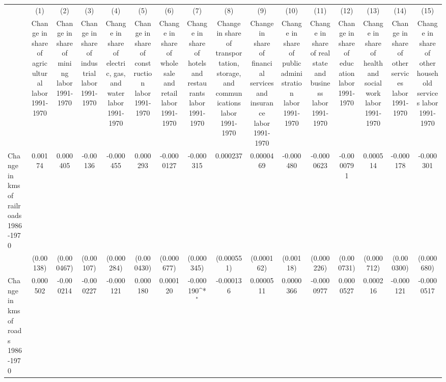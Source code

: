 {
\def\sym#1{\ifmmode^{#1}\else\(^{#1}\)\fi}
\begin{tabular}{l*{15}{c}}
\hline\hline
                &\multicolumn{1}{c}{(1)}&\multicolumn{1}{c}{(2)}&\multicolumn{1}{c}{(3)}&\multicolumn{1}{c}{(4)}&\multicolumn{1}{c}{(5)}&\multicolumn{1}{c}{(6)}&\multicolumn{1}{c}{(7)}&\multicolumn{1}{c}{(8)}&\multicolumn{1}{c}{(9)}&\multicolumn{1}{c}{(10)}&\multicolumn{1}{c}{(11)}&\multicolumn{1}{c}{(12)}&\multicolumn{1}{c}{(13)}&\multicolumn{1}{c}{(14)}&\multicolumn{1}{c}{(15)}\\
                &\multicolumn{1}{c}{Change in share of agricultural labor 1991-1970}&\multicolumn{1}{c}{Change in share of mining labor 1991-1970}&\multicolumn{1}{c}{Change in share of industrial labor 1991-1970}&\multicolumn{1}{c}{Change in share of electric, gas, and water labor 1991-1970}&\multicolumn{1}{c}{Change in share of construction labor 1991-1970}&\multicolumn{1}{c}{Change in share of wholesale and retail labor 1991-1970}&\multicolumn{1}{c}{Change in share of hotels and restaurants labor 1991-1970}&\multicolumn{1}{c}{Change in share of transportation, storage, and communications labor 1991-1970}&\multicolumn{1}{c}{Change in share of financial services and insurance labor 1991-1970}&\multicolumn{1}{c}{Change in share of public administration labor 1991-1970}&\multicolumn{1}{c}{Change in share of real state and business labor 1991-1970}&\multicolumn{1}{c}{Change in share of education labor 1991-1970}&\multicolumn{1}{c}{Change in share of health and social work labor 1991-1970}&\multicolumn{1}{c}{Change in share of other services labor 1991-1970}&\multicolumn{1}{c}{Change in share of other household services labor 1991-1970}\\
\hline
Change in kms of railroads 1986-1970&  0.00174         & 0.000405         & -0.00136         &-0.000455         & 0.000293         &-0.0000127         &-0.000315         & 0.000237         &0.0000469         &-0.000480         &-0.0000623         &-0.0000791         & 0.000514         &-0.000178         &-0.000301         \\
                &(0.00138)         &(0.000467)         &(0.00107)         &(0.000284)         &(0.000430)         &(0.000677)         &(0.000345)         &(0.000551)         &(0.000162)         &(0.00118)         &(0.000226)         &(0.000731)         &(0.000712)         &(0.000300)         &(0.000680)         \\
[1em]
Change in kms of roads 1986-1970& 0.000502         &-0.000214         &-0.000227         &-0.000121         & 0.000180         & 0.000120         &-0.000190\sym{*}  &-0.000136         &0.0000511         &0.0000366         &-0.0000977         &0.0000527         & 0.000216         &-0.000121         &-0.0000517         \\

\end{tabular}}
